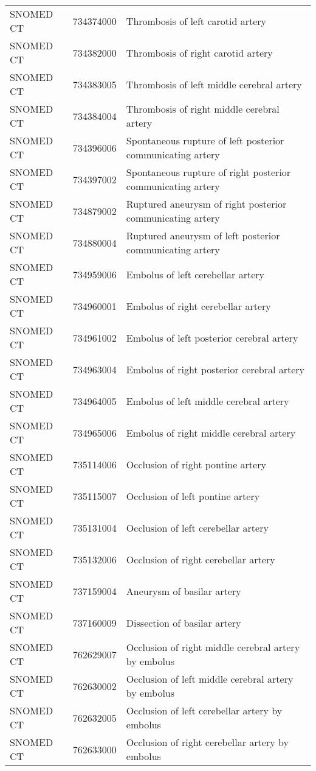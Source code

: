 \begin{longtable}{p{}p{}p{}}
  SNOMED CT & 734374000 & Thrombosis of left carotid artery \\ 
  SNOMED CT & 734382000 & Thrombosis of right carotid artery \\ 
  SNOMED CT & 734383005 & Thrombosis of left middle cerebral artery \\ 
  SNOMED CT & 734384004 & Thrombosis of right middle cerebral artery \\ 
  SNOMED CT & 734396006 & Spontaneous rupture of left posterior communicating artery \\ 
  SNOMED CT & 734397002 & Spontaneous rupture of right posterior communicating artery \\ 
  SNOMED CT & 734879002 & Ruptured aneurysm of right posterior communicating artery \\ 
  SNOMED CT & 734880004 & Ruptured aneurysm of left posterior communicating artery \\ 
  SNOMED CT & 734959006 & Embolus of left cerebellar artery \\ 
  SNOMED CT & 734960001 & Embolus of right cerebellar artery \\ 
  SNOMED CT & 734961002 & Embolus of left posterior cerebral artery \\ 
  SNOMED CT & 734963004 & Embolus of right posterior cerebral artery \\ 
  SNOMED CT & 734964005 & Embolus of left middle cerebral artery \\ 
  SNOMED CT & 734965006 & Embolus of right middle cerebral artery \\ 
  SNOMED CT & 735114006 & Occlusion of right pontine artery \\ 
  SNOMED CT & 735115007 & Occlusion of left pontine artery \\ 
  SNOMED CT & 735131004 & Occlusion of left cerebellar artery \\ 
  SNOMED CT & 735132006 & Occlusion of right cerebellar artery \\ 
  SNOMED CT & 737159004 & Aneurysm of basilar artery \\ 
  SNOMED CT & 737160009 & Dissection of basilar artery \\ 
  SNOMED CT & 762629007 & Occlusion of right middle cerebral artery by embolus \\ 
  SNOMED CT & 762630002 & Occlusion of left middle cerebral artery by embolus \\ 
  SNOMED CT & 762632005 & Occlusion of left cerebellar artery by embolus \\ 
  SNOMED CT & 762633000 & Occlusion of right cerebellar artery by embolus \\ 

\end{longtable}
